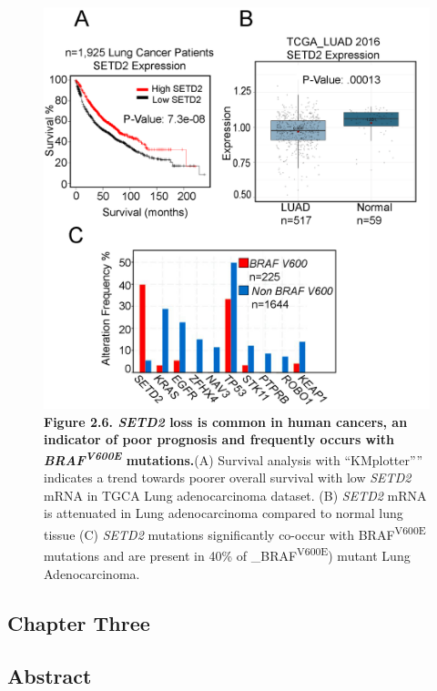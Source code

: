 \begin{figure}
\hypertarget{fig:09}{%
\centering
\includegraphics[width=1\textwidth,height=\textheight]{images/tuba6.png}
\caption{\textbf{Figure 2.6. \emph{SETD2} loss is common in human cancers, an indicator of poor prognosis and frequently occurs with \emph{BRAF\textsuperscript{V600E}} mutations.}(A) Survival analysis with ``KMplotter'''' indicates a trend towards poorer overall survival with low \emph{SETD2} mRNA in TGCA Lung adenocarcinoma dataset. (B) \emph{SETD2} mRNA is attenuated in Lung adenocarcinoma compared to normal lung tissue (C) \emph{SETD2} mutations significantly co-occur with BRAF\textsuperscript{V600E} mutations and are present in 40\% of \_BRAF\textsuperscript{V600E}) mutant Lung Adenocarcinoma.}\label{fig:09}
}
\end{figure}

\hypertarget{chapter-three}{%
\subsection{Chapter Three}\label{chapter-three}}

\hypertarget{abstract}{%
\subsection{Abstract}\label{abstract}}

